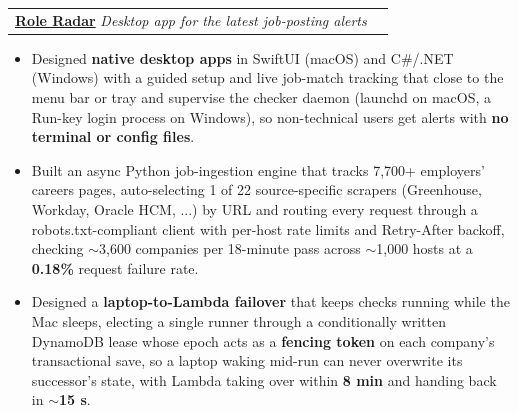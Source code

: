 \documentclass[letterpaper,11pt]{article}
\makeatletter
\newcommand{\SectionListBegin}{\begin{itemize}[leftmargin=0.15in, label={}]}
\newcommand{\BulletItems}[1]{
  \item
    \begin{itemize}[label={-}, leftmargin=*, labelsep=0.3em, topsep=0pt, partopsep=0pt, itemsep=0pt, parsep=0pt]
      \small #1
    \end{itemize}\vspace{-5pt}
}
\newcommand{\SLSubheadingItemLink}[4]{
  \vspace{-2pt}\item
    \begin{tabular*}{0.97\textwidth}[t]{l@{\extracolsep{\fill}}r}
      \textbf{\href{#2}{#1}} \textbar{} \textit{\small #3} & {\small #4} \\
    \end{tabular*}\vspace{-7pt}
}
\makeatother
\begin{document}
    \SLSubheadingItemLink
      {Role Radar}{https://github.com/anupreetsingh/Role-Radar}
      {Desktop app for the latest job-posting alerts}{} %
    \BulletItems{


      \item Designed \textbf{native desktop apps} in SwiftUI (macOS) and C\#/.NET (Windows) with a guided setup and live job-match tracking that close to the menu bar or tray and supervise the checker daemon (launchd on macOS, a Run-key login process on Windows), so non-technical users get alerts with \textbf{no terminal or config files}.

      \item Built an async Python job-ingestion engine that tracks 7,700+ employers' careers pages, auto-selecting 1 of 22 source-specific scrapers (Greenhouse, Workday, Oracle HCM, ...) by URL and routing every request through a robots.txt-compliant client with per-host rate limits and Retry-After backoff, checking $\sim$3,600 companies per 18-minute pass across $\sim$1,000 hosts at a \textbf{0.18\%} request failure rate.
      \item Designed a \textbf{laptop-to-Lambda failover} that keeps checks running while the Mac sleeps, electing a single runner through a conditionally written DynamoDB lease whose epoch acts as a \textbf{fencing token} on each company's transactional save, so a laptop waking mid-run can never overwrite its successor's state, with Lambda taking over within \textbf{8 min} and handing back in \textbf{$\sim$15 s}.

    }
\end{document}
